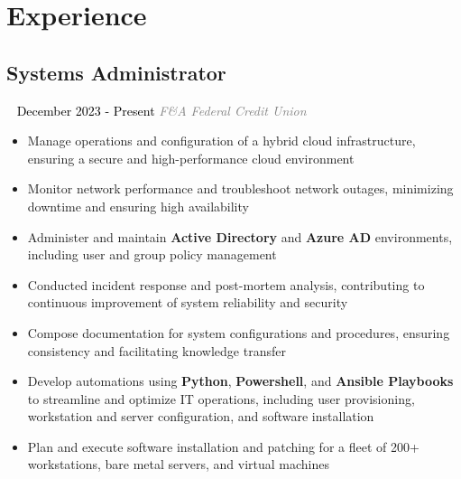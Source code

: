 \documentclass{article}
\newcommand{\resumesection}[3]{
    \subsection*{#1}
    \ 
    \normalsize
    \normalsize
    \hfill
    \textcolor{black}{#3}
    \normalsize
    \newline
    \small
    \textcolor{grey}{\emph{#2}}
}
\begin{document}
\pagestyle{useheader}
\section*{Experience}
\resumesection{Systems Administrator}{F\&A Federal Credit Union}{December 2023 - Present}
\begin{itemize}
    \item Manage operations and configuration of a hybrid cloud infrastructure, ensuring a secure and high-performance cloud environment
    \item Monitor network performance and troubleshoot network outages, minimizing downtime and ensuring high availability
    \item Administer and maintain \textbf{Active Directory} and \textbf{Azure AD} environments, including user and group policy management
    \item Conducted incident response and post-mortem analysis, contributing to continuous improvement of system reliability and security
    \item Compose documentation for system configurations and procedures, ensuring consistency and facilitating knowledge transfer
    \item Develop automations using \textbf{Python}, \textbf{Powershell}, and \textbf{Ansible Playbooks} to streamline and optimize IT operations, including user provisioning, workstation and server configuration, and software installation
    \item Plan and execute software installation and patching for a fleet of 200+ workstations, bare metal servers, and virtual machines
\end{itemize}
\end{document}
